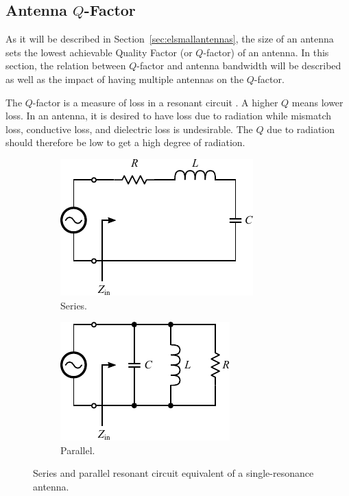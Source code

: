 \subsection{Antenna $Q$-Factor}
As it will be described in Section~\ref{sec:elsmallantennas}, the size of an antenna sets the lowest achievable Quality Factor (or $Q$-factor) of an antenna. In this section, the relation between $Q$-factor and antenna bandwidth will be described as well as the impact of having multiple antennas on the $Q$-factor.

The $Q$-factor is a measure of loss in a resonant circuit \cite{pozar2011microwave}. A higher $Q$ means lower loss. In an antenna, it is desired to have loss due to radiation while mismatch loss, conductive loss, and dielectric loss is undesirable. The $Q$ due to radiation should therefore be low to get a high degree of radiation.

\begin{figure}[htbp]
    \centering
    \begin{subfigure}[t]{0.49\linewidth}
        \centering
        \includegraphics{img/analysis/q_series}
        \caption{Series.}
    \end{subfigure}
    \hfill
    \begin{subfigure}[t]{0.49\linewidth}
        \centering
        \includegraphics{img/analysis/q_shunt}
        \caption{Parallel.}
    \end{subfigure}
    \caption{Series and parallel resonant circuit equivalent of a single-resonance antenna.}
    \label{fig:qresonanteq}
\end{figure}

